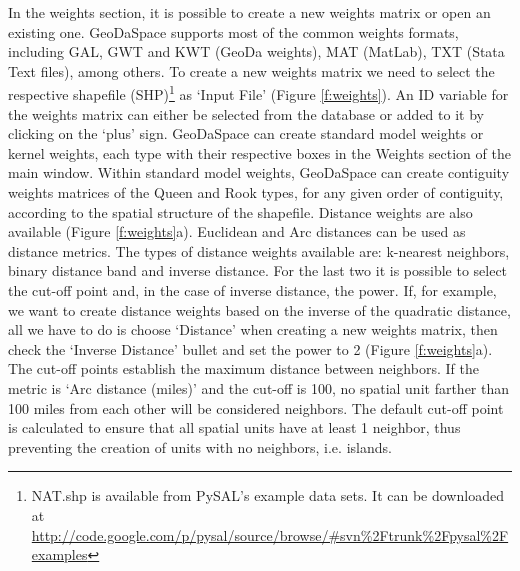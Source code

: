 \documentclass{article}
\begin{document}
In the weights section, it is possible to create a new weights matrix or open an existing one. GeoDaSpace supports most of the common weights formats, including GAL, GWT and KWT (GeoDa weights), MAT (MatLab), TXT (Stata Text files), among others. To create a new weights matrix we need to select the respective shapefile (SHP)\footnote{NAT.shp is available from PySAL's example data sets. It can be downloaded at \url{http://code.google.com/p/pysal/source/browse/\#svn\%2Ftrunk\%2Fpysal\%2Fexamples}} as `Input File' (Figure \ref{f:weights}). An ID variable for the weights matrix can either be selected from the database or added to it by clicking on the `plus' sign. GeoDaSpace can create standard model weights or kernel weights, each type with their respective boxes in the Weights section of the main window. Within standard model weights, GeoDaSpace can create contiguity weights matrices of the Queen and Rook types, for any given order of contiguity, according to the spatial structure of the shapefile. Distance weights are also available (Figure \ref{f:weights}a). Euclidean and Arc distances can be used as distance metrics. The types of distance weights available are: k-nearest neighbors, binary distance band and inverse distance. For the last two it is possible to select the cut-off point and, in the case of inverse distance, the power. If, for example, we want to create distance weights based on the inverse of the quadratic distance, all we have to do is choose `Distance' when creating a new weights matrix, then check the `Inverse Distance' bullet and set the power to 2 (Figure \ref{f:weights}a). The cut-off points establish the maximum distance between neighbors. If the metric is `Arc distance (miles)’ and the cut-off is 100, no spatial unit farther than 100 miles from each other will be considered neighbors. The default cut-off point is calculated to ensure that all spatial units have at least 1 neighbor, thus preventing the creation of units with no neighbors, i.e. islands.
\end{document}
